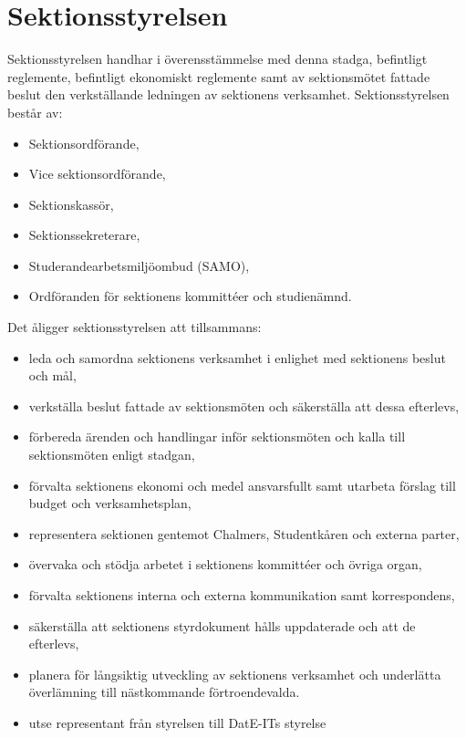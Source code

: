 \documentclass[a4paper]{dteklag}
\begin{document}
\section{Sektionsstyrelsen}
 Sektionsstyrelsen handhar i överensstämmelse med denna stadga, befintligt reglemente, befintligt ekonomiskt reglemente samt av sektionsmötet fattade beslut den verkställande ledningen av sektionens verksamhet.
\para Sektionsstyrelsen består av:
\begin{itemize}\setlength\itemsep{0em}
\item Sektionsordförande,
\item Vice sektionsordförande,
\item Sektionskassör,
\item Sektionssekreterare,
\item Studerandearbetsmiljöombud (SAMO),
\item Ordföranden för sektionens kommittéer och studienämnd.
\end{itemize}
\para[Åligganden] Det åligger sektionsstyrelsen att tillsammans:
\begin{itemize}\setlength\itemsep{0em}
\item leda och samordna sektionens verksamhet i enlighet med sektionens beslut och mål,
\item verkställa beslut fattade av sektionsmöten och säkerställa att dessa efterlevs,
\item förbereda ärenden och handlingar inför sektionsmöten och kalla till sektionsmöten enligt stadgan,
\item förvalta sektionens ekonomi och medel ansvarsfullt samt utarbeta förslag till budget och verksamhetsplan,
\item representera sektionen gentemot Chalmers, Studentkåren och externa parter,
\item övervaka och stödja arbetet i sektionens kommittéer och övriga organ, 
\item förvalta sektionens interna och externa kommunikation samt korrespondens, 
\item säkerställa att sektionens styrdokument hålls uppdaterade och att de efterlevs,
\item planera för långsiktig utveckling av sektionens verksamhet och underlätta överlämning till nästkommande förtroendevalda.
\item utse representant från styrelsen till DatE-ITs styrelse
\end{itemize}
\end{document}
